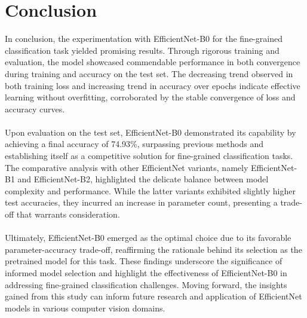 \documentclass[12pt, a4paper, twoside]{article}
\begin{document}
	\section{Conclusion}
		In conclusion, the experimentation with EfficientNet-B0 for the fine-grained classification task yielded promising results. Through rigorous training and evaluation, the model showcased commendable performance in both convergence during training and accuracy on the test set. The decreasing trend observed in both training loss and increasing trend in accuracy over epochs indicate effective learning without overfitting, corroborated by the stable convergence of loss and accuracy curves.
		\\
		\\
		Upon evaluation on the test set, EfficientNet-B0 demonstrated its capability by achieving a final accuracy of 74.93\%, surpassing previous methods and establishing itself as a competitive solution for fine-grained classification tasks. The comparative analysis with other EfficientNet variants, namely EfficientNet-B1 and EfficientNet-B2, highlighted the delicate balance between model complexity and performance. While the latter variants exhibited slightly higher test accuracies, they incurred an increase in parameter count, presenting a trade-off that warrants consideration.
		\\
		\\
		Ultimately, EfficientNet-B0 emerged as the optimal choice due to its favorable parameter-accuracy trade-off, reaffirming the rationale behind its selection as the pretrained model for this task. These findings underscore the significance of informed model selection and highlight the effectiveness of EfficientNet-B0 in addressing fine-grained classification challenges. Moving forward, the insights gained from this study can inform future research and application of EfficientNet models in various computer vision domains.
	
	\printbibliography
\end{document}
